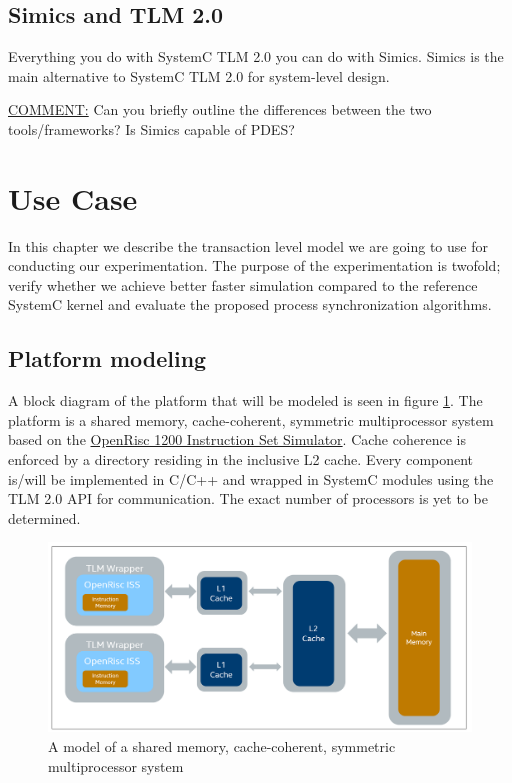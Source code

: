 \documentclass[12pt,twoside]{article}
\begin{document}
\subsection{Simics and TLM 2.0}
\label{sec-6-7}
Everything you do with SystemC TLM 2.0 you can do with Simics.
Simics is the main alternative to SystemC TLM 2.0 for system-level design.

\uline{COMMENT:} Can you briefly outline the differences between the two tools/frameworks?
Is Simics capable of PDES?
\clearpage


\section{Use Case}
\label{sec-7}
In this chapter we describe the transaction level model we are going to use for conducting our experimentation.
The purpose of the experimentation is twofold;
verify whether we achieve better faster simulation compared to the reference SystemC kernel and evaluate the proposed process synchronization algorithms.

\subsection{Platform modeling}
\label{sec-7-1}
A block diagram of the platform that will be modeled is seen in figure \ref{fig:Platform}.
The platform is a shared memory, cache-coherent, symmetric multiprocessor system based on the \href{http://opencores.org/or1k/Or1ksim}{OpenRisc 1200 Instruction Set Simulator}.
Cache coherence is enforced by a directory residing in the inclusive L2 cache.
Every component is/will be implemented in C/C++ and wrapped in SystemC modules using the TLM 2.0 API for communication. 
The exact number of processors is yet to be determined.

\begin{figure}[htb]
\centering
\includegraphics[width=.9\linewidth]{Figures/platform.png}
\caption{\label{fig:Platform}A model of a shared memory, cache-coherent, symmetric multiprocessor system}
\end{figure}
\end{document}
